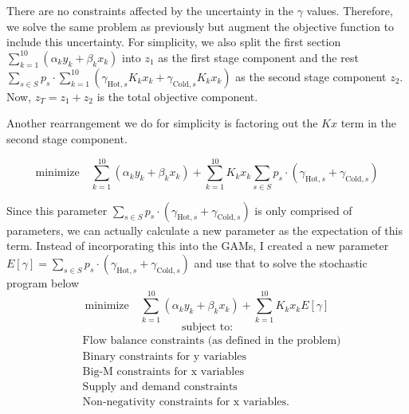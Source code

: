 \documentclass[11pt]{article}
\begin{document}
There are no constraints affected by the uncertainty in the $\gamma$ values.
Therefore, we solve the same problem as previously but augment the objective function to include this uncertainty.
For simplicity, we also split the first section $\sum_{k=1}^{10} \left( \alpha_k y_k + \beta_k x_k \right)$ into $z_1$ as the first stage component and the rest $\sum_{s \in S} p_s \cdot \sum_{k=1}^{10} \left( \gamma_{\text{Hot},s} K_k x_k + \gamma_{\text{Cold},s} K_k x_k \right)$ as the second stage component $z_2$.
Now, $z_T = z_1 + z_2$ is the total objective component.

Another rearrangement we do for simplicity is factoring out the $K x $ term in the second stage component.

\[
    \text{minimize} \quad \sum_{k=1}^{10} \left( \alpha_k y_k + \beta_k x_k \right) + \sum_{k=1}^{10} K_k x_k \sum_{s \in S} p_s \cdot  \left( \gamma_{\text{Hot},s}  + \gamma_{\text{Cold},s} \right)
\]

Since this parameter $\sum_{s \in S} p_s \cdot  \left( \gamma_{\text{Hot},s}  + \gamma_{\text{Cold},s} \right)$ is only comprised of parameters, we can actually calculate a new parameter as the expectation of this term.
Instead of incorporating this into the GAMs, I created a new parameter $E[\gamma] = \sum_{s \in S} p_s \cdot  \left( \gamma_{\text{Hot},s}  + \gamma_{\text{Cold},s} \right)$ and use that to solve the stochastic program below
\[
    \text{minimize} \quad \sum_{k=1}^{10} \left( \alpha_k y_k + \beta_k x_k \right) + \sum_{k=1}^{10} K_k x_k E[\gamma]
\]
\[
\text{subject to:}
\]
\[
\begin{aligned}
    & \text{Flow balance constraints (as defined in the problem)} \\
    & \text{Binary constraints for y variables} \\
    & \text{Big-M constraints for x variables} \\
    & \text{Supply and demand constraints} \\
    & \text{Non-negativity constraints for x variables.}
\end{aligned}
\]
\end{document}
